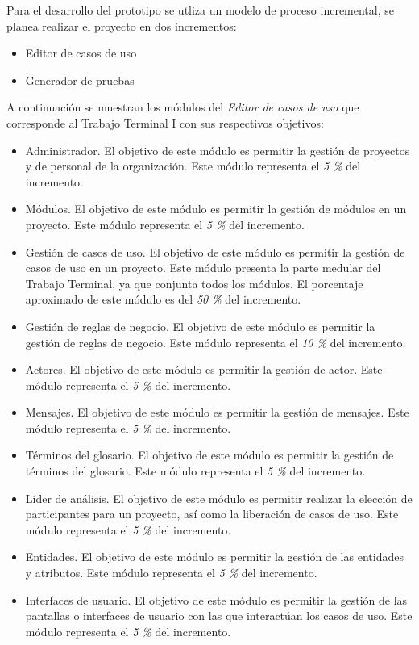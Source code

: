 Para el desarrollo del prototipo se utliza un modelo de proceso incremental, se planea realizar el proyecto en dos incrementos: 
\begin{itemize}
	\item Editor de casos de uso 
	\item Generador de pruebas
\end{itemize}

A continuación se muestran los módulos del {\it Editor de casos de uso} que corresponde al Trabajo Terminal I con sus respectivos objetivos:

\begin{itemize}
	\item Administrador. El objetivo de este módulo es permitir la gestión de proyectos y de personal de la organización. Este módulo representa el {\it 5 \%} del incremento.
	\item Módulos. El objetivo de este módulo es permitir la gestión de módulos en un proyecto. Este módulo representa el {\it 5 \%} del incremento.
	\item Gestión de casos de uso. El objetivo de este módulo es permitir la gestión de casos de uso en un proyecto. Este módulo presenta la parte medular del Trabajo Terminal, ya que conjunta todos los módulos. El porcentaje aproximado de este módulo es del {\it 50 \%} del incremento.
	\item Gestión de reglas de negocio. El objetivo de este módulo es permitir la gestión de reglas de negocio. Este módulo representa el {\it 10 \%} del incremento.
	\item Actores. El objetivo de este módulo es permitir la gestión de actor. Este módulo representa el {\it 5 \%} del incremento.
	\item Mensajes. El objetivo de este módulo es permitir la gestión de mensajes. Este módulo representa el {\it 5 \%} del incremento.
	\item Términos del glosario. El objetivo de este módulo es permitir la gestión de términos del glosario. Este módulo representa el {\it 5 \%} del incremento.
	\item Líder de análisis. El objetivo de este módulo es permitir realizar la elección de participantes para un proyecto, así como la liberación de casos de uso. Este módulo representa el {\it 5 \%} del incremento.
	\item Entidades. El objetivo de este módulo es permitir la gestión de las entidades y atributos. Este módulo representa el {\it 5 \%} del incremento.
	\item Interfaces de usuario. El objetivo de este módulo es permitir la gestión de las pantallas o interfaces de usuario con las que interactúan los casos de uso. Este módulo representa el {\it 5 \%} del incremento.
\end{itemize}


